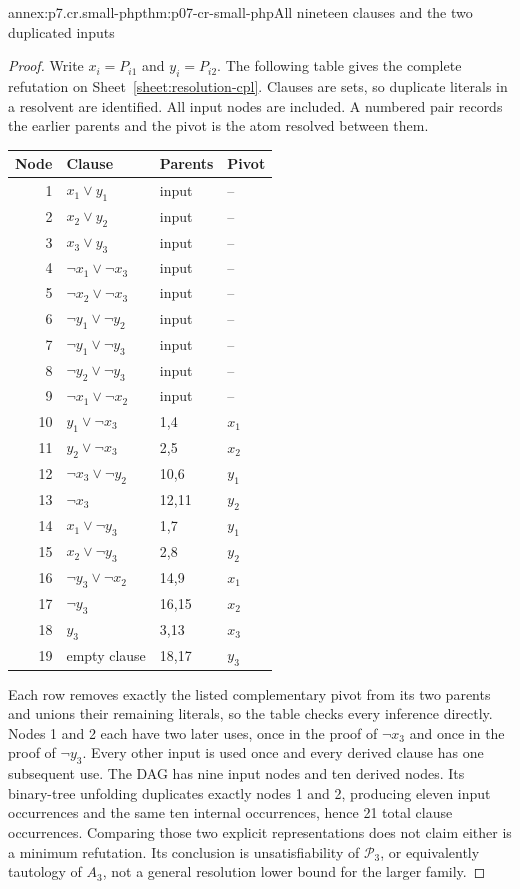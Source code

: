 \begin{annexitem}{annex:p7.cr.small-php}{thm:p07-cr-small-php}{All nineteen clauses and the two duplicated inputs}
\begin{proof}
Write \(x_i=P_{i1}\) and \(y_i=P_{i2}\).
The following table gives the complete refutation on
Sheet~\ref{sheet:resolution-cpl}. Clauses are sets, so
duplicate literals in a resolvent are identified. All input
nodes are included. A numbered pair records the earlier parents
and the pivot is the atom resolved between them.
\begin{center}\small
\begin{tabular}{@{}rlll@{}}
\toprule
Node & Clause & Parents & Pivot \\
\midrule
1 & \(x_1\lor y_1\) & input & -- \\
2 & \(x_2\lor y_2\) & input & -- \\
3 & \(x_3\lor y_3\) & input & -- \\
4 & \(\neg x_1\lor\neg x_3\) & input & -- \\
5 & \(\neg x_2\lor\neg x_3\) & input & -- \\
6 & \(\neg y_1\lor\neg y_2\) & input & -- \\
7 & \(\neg y_1\lor\neg y_3\) & input & -- \\
8 & \(\neg y_2\lor\neg y_3\) & input & -- \\
9 & \(\neg x_1\lor\neg x_2\) & input & -- \\
10 & \(y_1\lor\neg x_3\) & 1,4 & \(x_1\) \\
11 & \(y_2\lor\neg x_3\) & 2,5 & \(x_2\) \\
12 & \(\neg x_3\lor\neg y_2\) & 10,6 & \(y_1\) \\
13 & \(\neg x_3\) & 12,11 & \(y_2\) \\
14 & \(x_1\lor\neg y_3\) & 1,7 & \(y_1\) \\
15 & \(x_2\lor\neg y_3\) & 2,8 & \(y_2\) \\
16 & \(\neg y_3\lor\neg x_2\) & 14,9 & \(x_1\) \\
17 & \(\neg y_3\) & 16,15 & \(x_2\) \\
18 & \(y_3\) & 3,13 & \(x_3\) \\
19 & empty clause & 18,17 & \(y_3\) \\
\bottomrule
\end{tabular}
\end{center}
Each row removes exactly the listed complementary pivot from
its two parents and unions their remaining literals, so the
table checks every inference directly. Nodes 1 and 2 each have
two later uses, once in the proof of \(\neg x_3\) and once
in the proof of \(\neg y_3\). Every other input is used once
and every derived clause has one subsequent use. The DAG has
nine input nodes and ten derived nodes. Its binary-tree
unfolding duplicates exactly nodes 1 and 2, producing eleven
input occurrences and the same ten internal occurrences,
hence 21 total clause occurrences. Comparing those two explicit
representations does not claim either is a minimum refutation.
Its conclusion is unsatisfiability of \(\mathcal P_3\), or
equivalently tautology of \(A_3\), not a general resolution
lower bound for the larger family.
\end{proof}
\end{annexitem}

